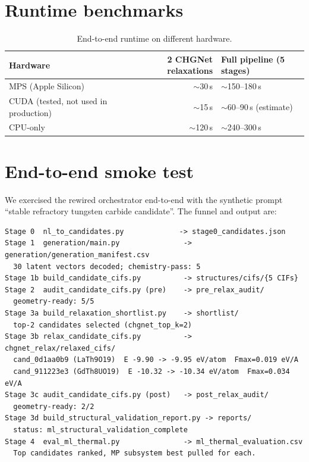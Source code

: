 \documentclass[11pt,a4paper]{report}
\begin{document}
\section{Runtime benchmarks}

\begin{table}[h]
\centering
\caption{End-to-end runtime on different hardware.}
\label{tab:runtime}
\begin{tabular}{lrl}
\toprule
\textbf{Hardware} & \textbf{2 CHGNet relaxations} & \textbf{Full pipeline (5 stages)} \\
\midrule
MPS (Apple Silicon) & $\sim$30\,s & $\sim$150--180\,s \\
CUDA (tested, not used in production) & $\sim$15\,s & $\sim$60--90\,s (estimate) \\
CPU-only & $\sim$120\,s & $\sim$240--300\,s \\
\bottomrule
\end{tabular}
\end{table}

\section{End-to-end smoke test}

We exercised the rewired orchestrator end-to-end with the synthetic prompt
``stable refractory tungsten carbide candidate''. The funnel and output are:

\begin{lstlisting}[language={},caption={Pipeline stdout excerpt.},label={lst:runout}]
Stage 0  nl_to_candidates.py             -> stage0_candidates.json
Stage 1  generation/main.py               -> generation/generation_manifest.csv
  30 latent vectors decoded; chemistry-pass: 5
Stage 1b build_candidate_cifs.py          -> structures/cifs/{5 CIFs}
Stage 2  audit_candidate_cifs.py (pre)    -> pre_relax_audit/
  geometry-ready: 5/5
Stage 3a build_relaxation_shortlist.py    -> shortlist/
  top-2 candidates selected (chgnet_top_k=2)
Stage 3b relax_candidate_cifs.py          -> chgnet_relax/relaxed_cifs/
  cand_0d1aa0b9 (LaTh9O19)  E -9.90 -> -9.95 eV/atom  Fmax=0.019 eV/A
  cand_911223e3 (GdTh8UO19)  E -10.32 -> -10.34 eV/atom  Fmax=0.034 eV/A
Stage 3c audit_candidate_cifs.py (post)   -> post_relax_audit/
  geometry-ready: 2/2
Stage 3d build_structural_validation_report.py -> reports/
  status: ml_structural_validation_complete
Stage 4  eval_ml_thermal.py               -> ml_thermal_evaluation.csv
  Top candidates ranked, MP subsystem best pulled for each.
\end{lstlisting}
\end{document}
